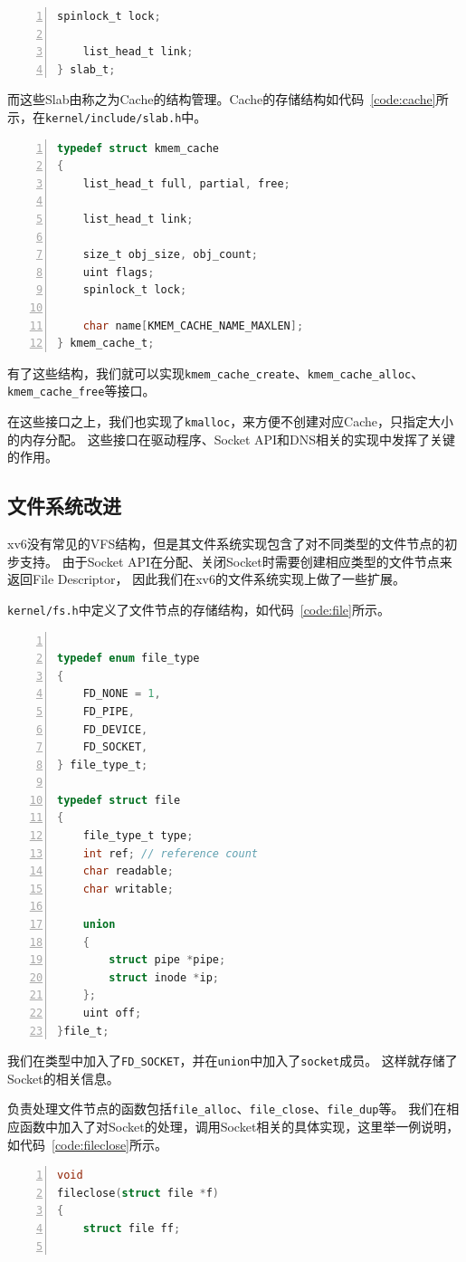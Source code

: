 \documentclass[a4paper,twoside]{ctexrep}
\begin{document}
\begin{spacing}{1.2}
\begin{lstlisting}[numbers=left,style=CppStyle,caption={Slab的存储结构},label={code:slab},language=C]
	spinlock_t lock;

	list_head_t link;
} slab_t;
\end{lstlisting}
而这些Slab由称之为Cache的结构管理。Cache的存储结构如代码~\ref{code:cache}所示，在\texttt{kernel/include/slab.h}中。
\begin{lstlisting}[numbers=left,style=CppStyle,caption={Cache的存储结构},label={code:cache},language=C]
typedef struct kmem_cache
{
	list_head_t full, partial, free;

	list_head_t link;

	size_t obj_size, obj_count;
	uint flags;
	spinlock_t lock;

	char name[KMEM_CACHE_NAME_MAXLEN];
} kmem_cache_t;
\end{lstlisting}
有了这些结构，我们就可以实现\texttt{kmem\_cache\_create}、\texttt{kmem\_cache\_alloc}、\texttt{kmem\_cache\_free}等接口。

在这些接口之上，我们也实现了\texttt{kmalloc}，来方便不创建对应Cache，只指定大小的内存分配。
这些接口在驱动程序、Socket API和DNS相关的实现中发挥了关键的作用。


\subsection{文件系统改进}

xv6没有常见的VFS结构，但是其文件系统实现包含了对不同类型的文件节点的初步支持。
由于Socket API在分配、关闭Socket时需要创建相应类型的文件节点来返回File Descriptor，
因此我们在xv6的文件系统实现上做了一些扩展。

\texttt{kernel/fs.h}中定义了文件节点的存储结构，如代码~\ref{code:file}所示。
\begin{lstlisting}[numbers=left,style=CppStyle,caption={文件节点的存储结构},label={code:file},language=C]

typedef enum file_type
{
	FD_NONE = 1,
	FD_PIPE,
	FD_DEVICE,
	FD_SOCKET,
} file_type_t;

typedef struct file
{
	file_type_t type;
	int ref; // reference count
	char readable;
	char writable;

	union
	{
		struct pipe *pipe;
		struct inode *ip;
	};
	uint off;
}file_t;

\end{lstlisting}
我们在类型中加入了\texttt{FD\_SOCKET}，并在\texttt{union}中加入了\texttt{socket}成员。
这样就存储了Socket的相关信息。

负责处理文件节点的函数包括\texttt{file\_alloc}、\texttt{file\_close}、\texttt{file\_dup}等。
我们在相应函数中加入了对Socket的处理，调用Socket相关的具体实现，这里举一例说明，如代码~\ref{code:fileclose}所示。
\begin{lstlisting}[numbers=left,style=CppStyle,caption={file\_alloc函数的修改},label={code:fileclose},language=C]
void
fileclose(struct file *f)
{
	struct file ff;


\end{lstlisting}
\end{spacing}
\end{document}
